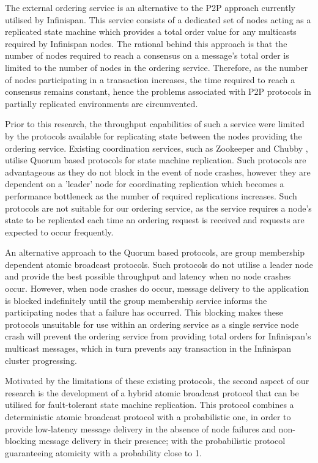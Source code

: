    The external ordering service is an alternative to the P2P approach currently utilised by Infinispan.  This service consists of a dedicated set of nodes acting as a replicated state machine which provides a total order value for any multicasts required by Infinispan nodes.  The rational behind this approach is that the number of nodes required to reach a consensus on a message's total order is limited to the number of nodes in the ordering service.  Therefore, as the number of nodes participating in a transaction increases, the time required to reach a consensus remains constant, hence the problems associated with P2P protocols in partially replicated environments are circumvented.

    Prior to this research, the throughput capabilities of such a service were limited by the protocols available for replicating state between the nodes providing the ordering service.  Existing coordination services, such as Zookeeper \citep{Hunt:2010:ZWC:1855840.1855851} and Chubby \citep{Burrows:2006:CLS:1298455.1298487}, utilise Quorum based protocols for state machine replication.  Such protocols are advantageous as they do not block in the event of node crashes, however they are dependent on a 'leader' node for coordinating replication which becomes a performance bottleneck as the number of required replications increases.  Such protocols are not suitable for our ordering service, as the service requires a node's state to be replicated each time an ordering request is received and requests are expected to occur frequently.  
    
    An alternative approach to the Quorum based protocols, are group membership dependent atomic broadcast protocols.  Such protocols do not utilise a leader node and provide the best possible throughput and latency when no node crashes occur.  However, when node crashes do occur, message delivery to the application is blocked indefinitely until the group membership service informs the participating nodes that a failure has occurred.  This blocking makes these protocols unsuitable for use within an ordering service as a single service node crash will prevent the ordering service from providing total orders for Infinispan's multicast messages, which in turn prevents any transaction in the Infinispan cluster progressing.  

    Motivated by the limitations of these existing protocols, the second aspect of our research is the development of a hybrid atomic broadcast protocol that can be utilised for fault-tolerant state machine replication.  This protocol combines a deterministic atomic broadcast protocol with a probabilistic one, in order to provide low-latency message delivery in the absence of node failures and non-blocking message delivery in their presence; with the probabilistic protocol guaranteeing atomicity with a probability close to 1.     
   
